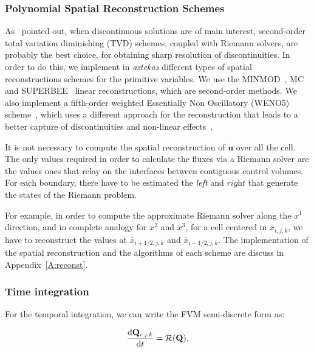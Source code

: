
\subsubsection{Polynomial Spatial Reconstruction Schemes}
\label{subsubsec:reconst}

As~\citet{delzanna2002} pointed out, when discontinuous solutions are
of main interest, second-order total variation diminishing (TVD) schemes, coupled
with Riemann solvers, are probably the best choice, for obtaining sharp resolution
of discontinuities. In order to do this, we implement in \textit{aztekas}
different types of spatial reconstructions schemes for the primitive variables. We use the
MINMOD~\citep{roe1986}, MC~\citep{vanleer1977} and SUPERBEE~\citep{roe1986}
linear reconstructions, which are second-order methods. We also implement a
fifth-order weighted Essentially Non Oscillatory (WENO5) scheme~\citep{weno2004}, which uses a different approach for the reconstruction that leads to a better capture of discontinuities and non-linear effects~\citep{lora2015}. 

It is not necessary to compute the spatial reconstruction of $\mathbf{u}$ over all the cell. The only values required in order to calculate the fluxes via a Riemann solver are the values ones that relay on the interfaces between contiguous control volumes. For each boundary, there have to be estimated the \textit{left} and $\textit{right}$ that generate the states of the Riemann problem.

For example, in order to compute the approximate Riemann solver along the $x^1$ direction, and in complete analogy for $x^2$ and $x^3$, for a cell centered in $\bar{x}_{i,j,k}$, we have to reconstruct the values at $\bar{x}_{i+1/2,j,k}$ and $\bar{x}_{i-1/2,j,k}$. The implementation of  the spatial reconstruction and the algorithms of each scheme are discuss in Appendix~\ref{A:reconst}.


\subsubsection{Time integration}
\label{subsubsec:tstep}

For the temporal integration, we can write the FVM semi-discrete form as:

\begin{equation}
    \begin{split}
    \frac{\mathrm{d} \mathbf{Q}_{i,j,k}}{\mathrm{d} t} = \mathcal{R}(\mathbf{Q}),
\end{split}
\label{eq:semi-disc}
\end{equation}

